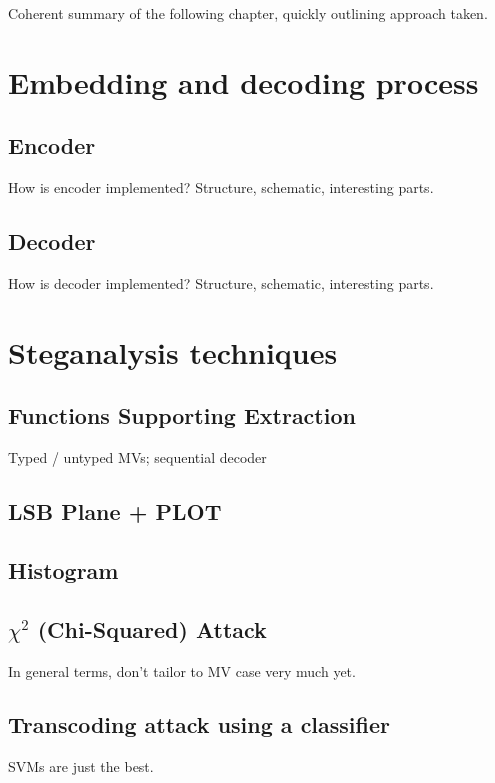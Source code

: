 \documentclass[12pt,british,twoside,notitlepage,usenames,dvipsnames,hypens,final]{report}
\numberwithin{equation}{section}
\numberwithin{figure}{section}
\begin{document}

Coherent summary of the following chapter, quickly outlining approach taken.

\section{Embedding and decoding process}

\subsection{Encoder}

How is encoder implemented? Structure, schematic, interesting parts. 

\subsection{Decoder}

How is decoder implemented? Structure, schematic, interesting parts. 

\section{Steganalysis techniques}

\subsection{Functions Supporting Extraction}

Typed / untyped MVs; sequential decoder

\subsection{LSB Plane + PLOT}

\subsection{Histogram}

\subsection{$\chi^2$ (Chi-Squared) Attack}

In general terms, don't tailor to MV case very much yet.

\subsection{Transcoding attack using a classifier}
SVMs are just the best.
\end{document}
